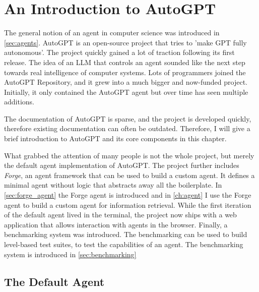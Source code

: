 \documentclass[../main.tex]{subfiles}
\begin{document}
\chapter{An Introduction to AutoGPT}
\label{ch:autogpt}

The general notion of an agent in computer science was introduced in \autoref{sec:agents}.
AutoGPT is an open-source project that tries to 'make GPT fully autonomous'.
The project quickly gained a lot of traction
following its first release.
The idea of an LLM that controls an agent sounded like the next step towards
real intelligence of computer systems.
Lots of programmers joined the AutoGPT Repository,
and it grew into a much bigger and now-funded project.
Initially, it only contained the AutoGPT agent
but over time has seen multiple additions.

The documentation of AutoGPT is sparse,
and the project is developed quickly,
therefore existing documentation
can often be outdated.
Therefore, I will give a brief introduction to AutoGPT and its core components
in this chapter.

What grabbed the attention of many people is not the whole project,
but merely the default agent implementation of AutoGPT.
The project further includes \emph{Forge},
an agent framework that can be used to build a custom agent.
It defines a minimal agent without logic
that abstracts away all the boilerplate.
In \autoref{sec:forge_agent} the Forge agent is introduced
and in \autoref{ch:agent} I use the Forge agent
to build a custom agent for information retrieval.
While the first iteration of the default agent lived in the terminal,
the project now ships with a web application
that allows interaction with agents in the browser.
Finally, a benchmarking system was introduced.
The benchmarking can be used to build level-based test suites,
to test the capabilities of an agent.
The benchmarking system is introduced in \autoref{sec:benchmarking}

\section{The Default Agent}
\label{sec:default_agent}
\end{document}
